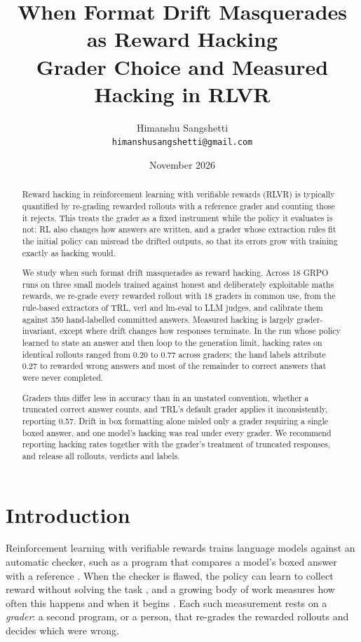 \documentclass[10pt]{article}
\title{\textbf{When Format Drift Masquerades as Reward Hacking}\\[2pt]\large Grader Choice and Measured Hacking in RLVR}
\author{Himanshu Sangshetti\\\small\texttt{himanshusangshetti@gmail.com}}
\date{November 2026}
\begin{document}
\maketitle

\begin{abstract}
Reward hacking in reinforcement learning with verifiable rewards (RLVR) is typically quantified by re-grading
rewarded rollouts with a reference grader and counting those it rejects. This treats the grader as a fixed
instrument while the policy it evaluates is not: RL also changes how answers are written, and a grader whose
extraction rules fit the initial policy can misread the drifted outputs, so that its errors grow with training
exactly as hacking would.

We study when such format drift masquerades as reward hacking. Across 18 GRPO runs on three small models trained
against honest and deliberately exploitable maths rewards, we re-grade every rewarded rollout with 18 graders in
common use, from the rule-based extractors of TRL, verl and lm-eval to LLM judges, and calibrate them against 350
hand-labelled committed answers. Measured hacking is largely grader-invariant, except where drift changes how
responses terminate. In the run whose policy learned to state an answer and then loop to the generation limit,
hacking rates on identical rollouts ranged from 0.20 to 0.77 across graders; the hand labels attribute 0.27 to
rewarded wrong answers and most of the remainder to correct answers that were never completed.

Graders thus differ less in accuracy than in an unstated convention, whether a truncated correct answer counts,
and TRL's default grader applies it inconsistently, reporting 0.57. Drift in box formatting alone misled only a
grader requiring a single boxed answer, and one model's hacking was real under every grader. We recommend
reporting hacking rates together with the grader's treatment of truncated responses, and release all rollouts,
verdicts and labels.
\end{abstract}

\section{Introduction}

Reinforcement learning with verifiable rewards trains language models against an automatic checker, such as a
program that compares a model's boxed answer with a reference \citep{deepseekmath,deepseekr1}. When the checker
is flawed, the policy can learn to collect reward without solving the task \citep{amodei2016concrete,skalse2022defining},
and a growing body of work measures how often this happens and when it begins
\citep{deng2026simhack,helff2026gaming,zhang2026leaky,moya2026verifier}. Each such measurement rests on a
\emph{grader}: a second program, or a person, that re-grades the rewarded rollouts and decides which were wrong.
\end{document}
